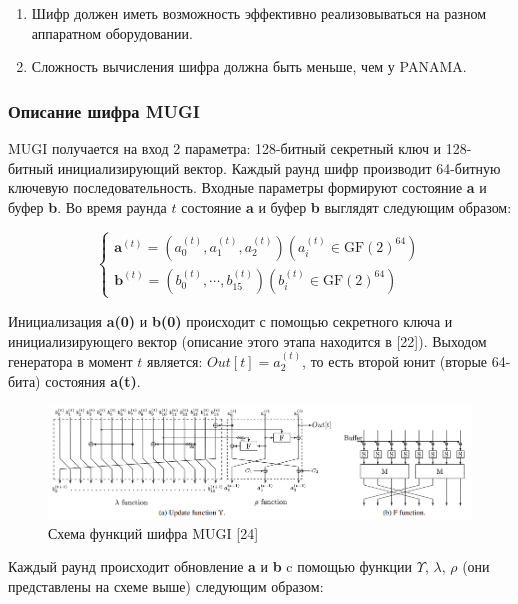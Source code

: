 \documentclass[colorthm]{./civarticle}
\begin{document}
\begin{enumerate}
    \item Шифр должен иметь возможность эффективно реализовываться на разном аппаратном оборудовании. 
    \item Сложность вычисления шифра должна быть меньше, чем у PANAMA.
\end{enumerate}

\subsubsection{Описание шифра MUGI}

MUGI получается на вход 2 параметра: 128-битный секретный ключ и 128-битный инициализирующий вектор. Каждый раунд шифр производит 64-битную ключевую последовательность. Входные параметры формируют состояние \textbf{a} и буфер \textbf{b}. Во время раунда $t$ состояние \textbf{a} и буфер \textbf{b} выглядят следующим образом: 

\begin{equation}
    \left\{\begin{array}{l}
\mathbf{a}^{(t)}=\left(a_0^{(t)}, a_1^{(t)}, a_2^{(t)}\right)\left(a_i^{(t)} \in \mathrm{GF}(2)^{64}\right) \\
\mathbf{b}^{(t)}=\left(b_0^{(t)}, \cdots, b_{15}^{(t)}\right)\left(b_i^{(t)} \in \mathrm{GF}(2)^{64}\right)
\end{array}\right.
\end{equation}

Инициализация \textbf{a(0)} и \textbf{b(0)} происходит с помощью секретного ключа и инициализирующего вектор (описание этого этапа находится в [22]). Выходом генератора в момент $t$ является: $Out[t] = a_2^(t)$, то есть второй юнит (вторые 64-бита) состояния \textbf{a(t)}.

\begin{figure}[H]
    \centering
    \includegraphics[width=1\linewidth]{Снимок экрана 2024-01-12 115522.png}
    \caption{Схема функций шифра MUGI [24]}
    \label{fig:enter-label}
\end{figure}

Каждый раунд происходит обновление \textbf{a} и \textbf{b} c помощью функции $\Upsilon$, $\lambda$, $\rho$ (они представлены на схеме выше) следующим образом:
\end{document}
